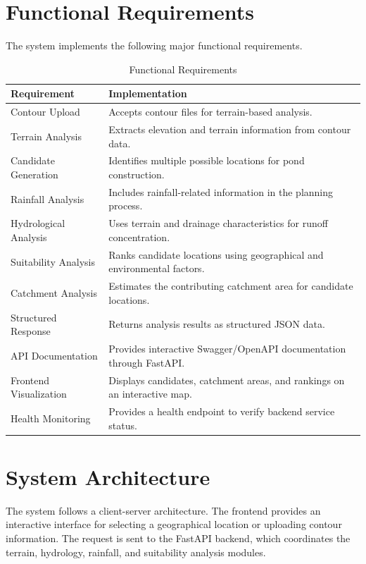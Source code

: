 \documentclass[12pt,a4paper]{article}
\begin{document}
\section{Functional Requirements}

The system implements the following major functional requirements.

\begin{table}[H]
\centering
\caption{Functional Requirements}
\begin{tabular}{p{4cm} p{9cm}}
\toprule
\textbf{Requirement} & \textbf{Implementation} \\
\midrule
Contour Upload & Accepts contour files for terrain-based analysis. \\
Terrain Analysis & Extracts elevation and terrain information from contour data. \\
Candidate Generation & Identifies multiple possible locations for pond construction. \\
Rainfall Analysis & Includes rainfall-related information in the planning process. \\
Hydrological Analysis & Uses terrain and drainage characteristics for runoff concentration. \\
Suitability Analysis & Ranks candidate locations using geographical and environmental factors. \\
Catchment Analysis & Estimates the contributing catchment area for candidate locations. \\
Structured Response & Returns analysis results as structured JSON data. \\
API Documentation & Provides interactive Swagger/OpenAPI documentation through FastAPI. \\
Frontend Visualization & Displays candidates, catchment areas, and rankings on an interactive map. \\
Health Monitoring & Provides a health endpoint to verify backend service status. \\
\bottomrule
\end{tabular}
\end{table}

\section{System Architecture}

The system follows a client-server architecture. The frontend provides an interactive
interface for selecting a geographical location or uploading contour information. The
request is sent to the FastAPI backend, which coordinates the terrain, hydrology,
rainfall, and suitability analysis modules.
\end{document}
